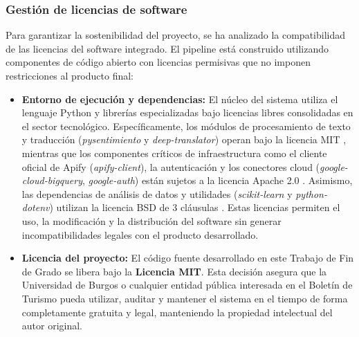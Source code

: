 \subsubsection{Gestión de licencias de software}
Para garantizar la sostenibilidad del proyecto, se ha analizado la compatibilidad de las licencias del software integrado. El pipeline está construido utilizando componentes de código abierto con licencias permisivas que no imponen restricciones al producto final:
\begin{itemize}
    \item \textbf{Entorno de ejecución y dependencias:} El núcleo del sistema utiliza el lenguaje Python y librerías especializadas bajo licencias libres consolidadas en el sector tecnológico. Específicamente, los módulos de procesamiento de texto y traducción (\textit{pysentimiento} y \textit{deep-translator}) operan bajo la licencia MIT \cite{pypi_pysentimiento, pypi_deeptranslator}, mientras que los componentes críticos de infraestructura como el cliente oficial de Apify (\textit{apify-client}), la autenticación y los conectores cloud (\textit{google-cloud-bigquery}, \textit{google-auth}) están sujetos a la licencia Apache 2.0 \cite{pypi_apify, pypi_bigquery}. Asimismo, las dependencias de análisis de datos y utilidades (\textit{scikit-learn} y \textit{python-dotenv}) utilizan la licencia BSD de 3 cláusulas \cite{pypi_scikit}. Estas licencias permiten el uso, la modificación y la distribución del software sin generar incompatibilidades legales con el producto desarrollado.
    \item \textbf{Licencia del proyecto:} El código fuente desarrollado en este Trabajo de Fin de Grado se libera bajo la \textbf{Licencia MIT}. Esta decisión asegura que la Universidad de Burgos o cualquier entidad pública interesada en el Boletín de Turismo pueda utilizar, auditar y mantener el sistema en el tiempo de forma completamente gratuita y legal, manteniendo la propiedad intelectual del autor original.
\end{itemize}






